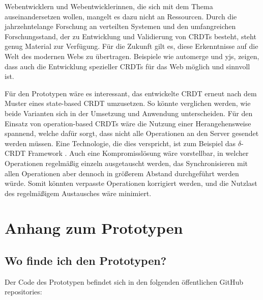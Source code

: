 \documentclass[a4paper, 12pt]{scrreprt}
\begin{document}
Webentwicklern und Webentwicklerinnen, die sich mit dem Thema auseinandersetzen wollen, mangelt es dazu nicht an Ressourcen. Durch die jahrzehntelange Forschung an verteilten Systemen und den umfangreichen Forschungsstand, der zu Entwicklung und Validierung von CRDTs besteht, steht genug Material zur Verfügung. Für die Zukunft gilt es, diese Erkenntnisse auf die Welt des modernen Webs zu übertragen. Beispiele wie automerge und yjs, zeigen, dass auch die Entwicklung spezieller CRDTs für das Web möglich und sinnvoll ist. 

Für den Prototypen wäre es interessant, das entwickelte CRDT erneut nach dem Muster eines state-based CRDT umzusetzen. So könnte verglichen werden, wie beide Varianten sich in der Umsetzung und Anwendung unterscheiden. Für den Einsatz von operation-based CRDTs wäre die Nutzung einer Herangehensweise spannend, welche dafür sorgt, dass nicht alle Operationen an den Server gesendet werden müssen. Eine Technologie, die dies verspricht, ist zum Beispiel das $\delta$-CRDT Framework \autocite{articleDeltaCRDT}. Auch eine Kompromisslösung wäre vorstellbar, in welcher Operationen regelmäßig einzeln ausgetauscht werden, das Synchronisieren mit allen Operationen aber dennoch in größerem Abstand durchgeführt werden würde. Somit könnten verpasste Operationen korrigiert werden, und die Nutzlast des regelmäßigem Austausches wäre minimiert.







\newpage
\listoffigures
\newpage
\lstlistoflistings
\newpage
\printbibliography[title ={Literaturquellen}, filter=literatur, sorting=nty]
\printbibliography[type=online, title ={Onlinequellen}]
\printbibliography[filter=other, title = {Weitere Quellen}]
\newpage
\section*{Anhang zum Prototypen}
\subsection*{Wo finde ich den Prototypen?}
Der Code des Prototypen befindet sich in den folgenden öffentlichen GitHub repositories:
\end{document}
